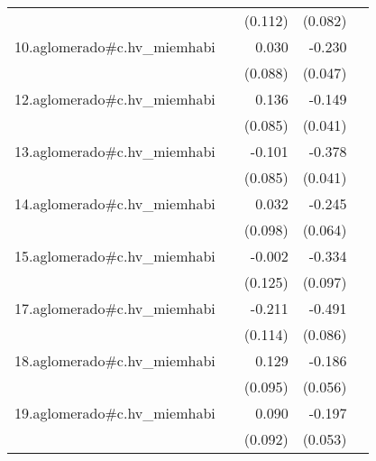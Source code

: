 {\begin{longtable}{l*{4}{D{.}{.}{-1}}}
            &                     &     (0.112)         &     (0.082)         &                     \\
\addlinespace
10.aglomerado#c.hv\_miemhabi&                     &       0.030         &      -0.230\sym{***}&                     \\
            &                     &     (0.088)         &     (0.047)         &                     \\
\addlinespace
12.aglomerado#c.hv\_miemhabi&                     &       0.136         &      -0.149\sym{***}&                     \\
            &                     &     (0.085)         &     (0.041)         &                     \\
\addlinespace
13.aglomerado#c.hv\_miemhabi&                     &      -0.101         &      -0.378\sym{***}&                     \\
            &                     &     (0.085)         &     (0.041)         &                     \\
\addlinespace
14.aglomerado#c.hv\_miemhabi&                     &       0.032         &      -0.245\sym{***}&                     \\
            &                     &     (0.098)         &     (0.064)         &                     \\
\addlinespace
15.aglomerado#c.hv\_miemhabi&                     &      -0.002         &      -0.334\sym{***}&                     \\
            &                     &     (0.125)         &     (0.097)         &                     \\
\addlinespace
17.aglomerado#c.hv\_miemhabi&                     &      -0.211         &      -0.491\sym{***}&                     \\
            &                     &     (0.114)         &     (0.086)         &                     \\
\addlinespace
18.aglomerado#c.hv\_miemhabi&                     &       0.129         &      -0.186\sym{***}&                     \\
            &                     &     (0.095)         &     (0.056)         &                     \\
\addlinespace
19.aglomerado#c.hv\_miemhabi&                     &       0.090         &      -0.197\sym{***}&                     \\
            &                     &     (0.092)         &     (0.053)         &                     \\

\end{longtable}}

